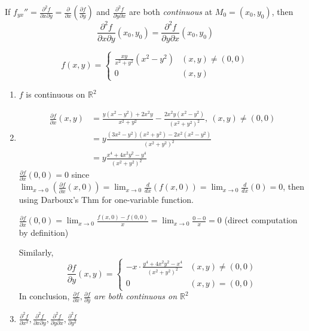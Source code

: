 \begin{theorem}
    If $f_{yx}''=\frac{\partial^2f}{\partial x\partial y}=\frac{\partial}{\partial x}\left(\frac{\partial f}{\partial y}\right)$ and $\frac{\partial^2f}{\partial y\partial x}$ are both \emph{continuous} at $M_0=(x_0,y_0)$, then
    $$
        \frac{\partial^2f}{\partial x\partial y}(x_0,y_0)=\frac{\partial^2f}{\partial y\partial x}(x_0,y_0)
    $$
\end{theorem}
\begin{example}

    $$
        f(x,y)=\begin{cases}
            \frac{xy}{x^2+y^2}(x^2-y^2) & (x,y)\neq(0,0) \\
            0                           & (x,y)
        \end{cases}
    $$
    \begin{enumerate}[label=\emph{(\arabic*)}]
        \item $f$ is continuous on $\mathbb{R}^2$
        \item \begin{align*}
                  \frac{\partial f}{\partial x}(x,y) & =\frac{y(x^2-y^2)+2x^2y}{x^2+y^2}-\frac{2x^2y(x^2-y^2)}{(x^2+y^2)^2},\ (x,y)\neq(0,0) \\
                                                     & =y\frac{(3x^2-y^2)(x^2+y^2)-2x^2(x^2-y^2)}{(x^2+y^2)^2}                               \\
                                                     & =y\frac{x^4+4x^2y^2-y^4}{(x^2+y^2)^2}
              \end{align*}
              $\frac{\partial f}{\partial x}(0,0)=0$ since $\lim_{x\to0}\left(\frac{\partial f}{\partial x}(x,0)\right)=\lim_{x\to 0}\frac{d}{dx}(f(x,0))=\lim_{x\to0}\frac{d}{dx}(0)=0$, then using Darboux's Thm for one-variable function.

              $\frac{\partial f}{\partial x}(0,0)=\lim_{x\to0}\frac{f(x,0)-f(0,0)}{x}=\lim_{x\to 0}\frac{0-0}{x}=0$ (direct computation by definition)

              Similarly,
              $$
                  \frac{\partial f}{\partial y}(x,y)=\begin{cases}
                      -x\cdot\frac{y^4+4x^2y^2-x^4}{(x^2+y^2)^2} & (x,y)\neq(0,0) \\
                      0                                          & (x,y)=(0,0)
                  \end{cases}
              $$
              In conclusion, \emph{$\frac{\partial f}{\partial x},\frac{\partial f}{\partial y}$ are both continuous on $\mathbb{R}^2$}
        \item $\frac{\partial^2 f}{\partial x^2},\frac{\partial^2 f}{\partial x\partial y},\frac{\partial^2 f}{\partial y\partial x},\frac{\partial^2 f}{\partial y^2}$


\end{enumerate}
\end{example}
